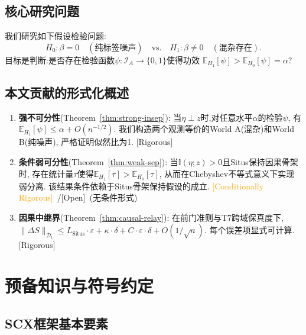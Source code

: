 \documentclass[12pt,a4paper]{article}
\newcommand{\rigorous}{\textcolor{green!50!black}{\small\textsf{[Rigorous]}}}
\newcommand{\conditionallyrigorous}{\textcolor{orange}{\small\textsf{[Conditionally Rigorous]}}}
\newcommand{\openquest}{\textcolor{red!70!black}{\small\textsf{[Open]}}}
\newcommand{\E}{\mathbb{E}}
\newcommand{\I}{\mathbb{I}}
\newcommand{\cD}{\mathcal{D}}
\newcommand{\cI}{\mathcal{I}}
\newcommand{\Situs}{\mathrm{Situs}}
\begin{document}
\subsection{核心研究问题}

我们研究如下假设检验问题:
\begin{equation}\label{eq:testing-problem}
    H_0: \beta = 0 \quad (\text{纯标签噪声})\quad \text{vs.}\quad
    H_1: \beta \neq 0 \quad (\text{混杂存在}).
\end{equation}
目标是判断:是否存在检验函数$\psi: \cI_A \to \{0,1\}$使得功效
$\E_{H_1}[\psi] > \E_{H_0}[\psi] = \alpha$?

\subsection{本文贡献的形式化概述}

\begin{enumerate}[label=(\arabic*)]
    \item \textbf{强不可分性}(Theorem~\ref{thm:strong-insep}):
          当$\eta \perp z$时,对任意水平$\alpha$的检验$\psi$,
          有$\E_{H_1}[\psi] \leq \alpha + O(n^{-1/2})$.
          我们构造两个观测等价的World A(混杂)和World B(纯噪声),
          严格证明似然比为1.
          \rigorous
    \item \textbf{条件弱可分性}(Theorem~\ref{thm:weak-sep}):
          当$\I(\eta;z) > 0$且Situs保持因果骨架时,
          存在统计量$\tau$使得$\E_{H_1}[\tau] > \E_{H_0}[\tau]$,
          从而在Chebyshev不等式意义下实现弱分离.
          该结果条件依赖于Situs骨架保持假设的成立.
          \conditionallyrigorous~/\openquest~(无条件形式)
    \item \textbf{因果中继界}(Theorem~\ref{thm:causal-relay}):
          在前门准则与T7跨域保真度下,
          $\|\Delta S\|_{\cD_t} \leq L_{\Situs}\cdot\varepsilon + \kappa\cdot\delta + C\cdot\varepsilon\cdot\delta + O(1/\sqrt{n})$.
          每个误差项显式可计算.
          \rigorous
\end{enumerate}

\section{预备知识与符号约定}
\label{sec:prelim}

\subsection{SCX框架基本要素}
\end{document}
